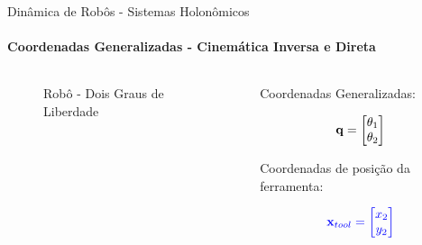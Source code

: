 \documentclass{beamer}
\begin{document}
\begin{frame}{Dinâmica de Robôs - Sistemas Holonômicos}
    \framesubtitle{Coordenadas Generalizadas - Cinemática Inversa e Direta}


    \begin{columns}
        \begin{column}[c]{0.6\textwidth}
            \begin{figure}[!ht]
                
                \caption{Robô - Dois Graus de Liberdade\footnotemark}
            \end{figure}
        \end{column}
        \begin{column}[c]{0.4\textwidth}
            
            Coordenadas Generalizadas:

            $$
            \color{black}{
                \mathbf{q} = 
                \begin{bmatrix}
                \theta_1 \\
                \theta_2    
                \end{bmatrix}
            }
            $$

            Coordenadas de posição da ferramenta: 

            $$
            \color{blue}{
                \mathbf{x}_{tool} = 
                \begin{bmatrix}
                x_2 \\
                y_2    
                \end{bmatrix}
            }
            $$
        \end{column}
    \end{columns}
\end{frame}
\end{document}
